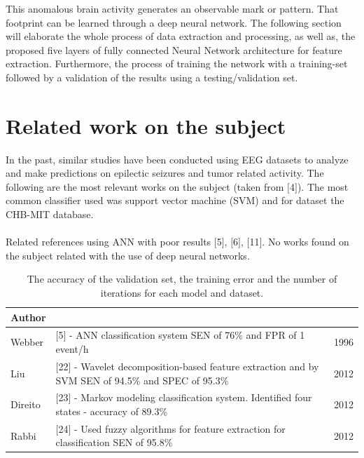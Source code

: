 \documentclass{llncs}       %
\begin{document}
This anomalous brain activity generates an observable mark or pattern. That footprint can be learned through a deep neural network. The following section will elaborate the whole process of data extraction and processing, as well as, the proposed five layers of fully connected Neural Network architecture for feature extraction. Furthermore, the process of training the network with a training-set followed by a validation of the results using a testing/validation set. 

\paragraph{}\paragraph{}

\section{Related work on the subject}
\label{sec:1}

In the past, similar studies have been conducted using EEG datasets to analyze and make predictions on epilectic seizures and tumor related activity. 
The following are the most relevant works on the subject (taken from $[$4$]$). The most common classifier 
used was support vector machine (SVM) and for dataset the CHB-MIT 
database. 


\paragraph{}
Related references using ANN with poor results $[$5$]$, $[$6$]$, 
$[$11$]$. No works found on the subject related with the use of deep neural networks.

\begin{table}[h!]
\begin{tabular}{ |p{1.5cm}|p{10cm}|p{1.2cm}|  }

 \hline
 Author     & & \\
 \hline
 Webber &  $[$5$]$ - ANN classification system SEN of 76\% and FPR of 1 event/h &1996 \\
 Liu&  $[$22$]$ - Wavelet decomposition-based feature extraction  and by SVM  SEN of 94.5\% and SPEC of 95.3\% & 2012 \\
Direito& $[$23$]$ - Markov modeling classification system. Identified four states - accuracy of 89.3\% & 2012 \\
Rabbi& $[$24$]$ - Used fuzzy algorithms for feature extraction for classification SEN of 95.8\%  & 2012 \\
 \hline
\end{tabular}
\caption{ The accuracy of the validation set, the training error and the number of iterations for each model and dataset.}
\end{table}
\end{document}
